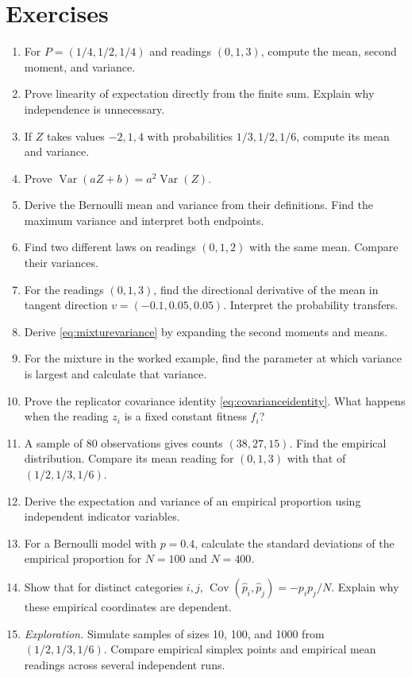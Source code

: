 \documentclass[11pt,oneside,openany]{book}
\theoremstyle{definition}
\theoremstyle{remark}
\newenvironment{exercises}{\begin{enumerate}[label=\thechapter.\arabic*,ref=\thechapter.\arabic*,leftmargin=2.8em,itemsep=6pt]}{\end{enumerate}}
\newcommand{\Var}{\operatorname{Var}}
\newcommand{\Cov}{\operatorname{Cov}}
\numberwithin{equation}{chapter}
\begin{document}
\FloatBarrier
\section{Exercises}
\begin{exercises}
\item For $P=(1/4,1/2,1/4)$ and readings $(0,1,3)$, compute the mean, second moment, and variance.
\item Prove linearity of expectation directly from the finite sum. Explain why independence is unnecessary.
\item If $Z$ takes values $-2,1,4$ with probabilities $1/3,1/2,1/6$, compute its mean and variance.
\item Prove $\Var(aZ+b)=a^2\Var(Z)$.
\item Derive the Bernoulli mean and variance from their definitions. Find the maximum variance and interpret both endpoints.
\item Find two different laws on readings $(0,1,2)$ with the same mean. Compare their variances.
\item For the readings $(0,1,3)$, find the directional derivative of the mean in tangent direction $v=(-0.1,0.05,0.05)$. Interpret the probability transfers.
\item Derive \eqref{eq:mixturevariance} by expanding the second moments and means.
\item For the mixture in the worked example, find the parameter at which variance is largest and calculate that variance.
\item Prove the replicator covariance identity \eqref{eq:covarianceidentity}. What happens when the reading $z_i$ is a fixed constant fitness $f_i$?
\item A sample of 80 observations gives counts $(38,27,15)$. Find the empirical distribution. Compare its mean reading for $(0,1,3)$ with that of $(1/2,1/3,1/6)$.
\item Derive the expectation and variance of an empirical proportion using independent indicator variables.
\item For a Bernoulli model with $p=0.4$, calculate the standard deviations of the empirical proportion for $N=100$ and $N=400$.
\item Show that for distinct categories $i,j$, $\Cov(\widehat p_i,\widehat p_j)=-p_ip_j/N$. Explain why these empirical coordinates are dependent.
\item \emph{Exploration.} Simulate samples of sizes 10, 100, and 1000 from $(1/2,1/3,1/6)$. Compare empirical simplex points and empirical mean readings across several independent runs.

\end{exercises}
\end{document}
